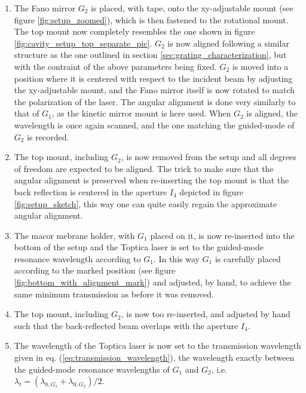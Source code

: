 \begin{enumerate}
    \item The Fano mirror $G_2$ is placed, with tape, onto the xy-adjustable mount (see figure \ref{fig:setup_zoomed}), which is then fastened to the rotational mount. The top mount now completely resembles the one shown in figure \ref{fig:cavity_setup_top_separate_pic}. $G_2$ is now aligned following a similar structure as the one outlined in section \ref{sec:grating_characterization}, but with the contraint of the above parameters being fixed. $G_2$ is moved into a position where it is centered with respect to the incident beam by adjusting the xy-adjustable mount, and the Fano mirror itself is now rotated to match the polarization of the laser. The angular alignment is done very similarly to that of $G_1$, as the kinetic mirror mount is here used. When $G_2$ is aligned, the wavelength is once again scanned, and the one matching the guided-mode of $G_2$ is recorded.
    \item The top mount, including $G_2$, is now removed from the setup and all degrees of freedom are expected to be aligned. The trick to make sure that the angular alignment is preserved when re-inserting the top mount is that the back reflection is centered in the aperture $I_4$ depicted in figure \ref{fig:setup_sketch}, this way one can quite easily regain the approximate angular alignment.
    \item The macor mebrane holder, with $G_1$ placed on it, is now re-inserted into the bottom of the setup and the Toptica laser is set to the guided-mode resonance wavelength according to $G_1$. In this way $G_1$ is carefully placed according to the marked position (see figure \ref{fig:bottom_with_alignment_mark}) and adjusted, by hand, to achieve the same minimum transmission as before it was removed. 
    \item The top mount, including $G_2$, is now too re-inserted, and adjusted by hand such that the back-reflected beam overlaps with the aperture $I_4$. 
    \item The wavelength of the Toptica laser is now set to the transmission wavelength given in eq. (\ref{eq:transmission_wavelength}), the wavelength exactly between the guided-mode resonance wavelengths of $G_1$ and $G_2$, i.e. $\lambda_t = (\lambda_{0,G_1} + \lambda_{0,G_2})/2$. 
\end{enumerate}

